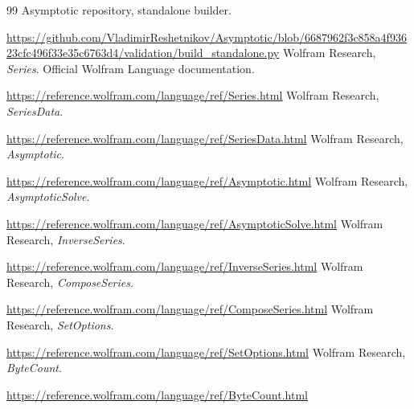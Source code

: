 \documentclass[11pt]{article}
\newcommand{\srcurl}[1]{\url{https://github.com/VladimirReshetnikov/Asymptotic/blob/6687962f3c858a4f93623cfc496f33e35c6763d4/#1}}
\begin{document}
\begin{thebibliography}{99}
 Asymptotic repository, standalone builder.\par\srcurl{validation/build_standalone.py}
 Wolfram Research, \emph{Series}. Official Wolfram Language documentation.\par\url{https://reference.wolfram.com/language/ref/Series.html}
 Wolfram Research, \emph{SeriesData}.\par\url{https://reference.wolfram.com/language/ref/SeriesData.html}
 Wolfram Research, \emph{Asymptotic}.\par\url{https://reference.wolfram.com/language/ref/Asymptotic.html}
 Wolfram Research, \emph{AsymptoticSolve}.\par\url{https://reference.wolfram.com/language/ref/AsymptoticSolve.html}
 Wolfram Research, \emph{InverseSeries}.\par\url{https://reference.wolfram.com/language/ref/InverseSeries.html}
 Wolfram Research, \emph{ComposeSeries}.\par\url{https://reference.wolfram.com/language/ref/ComposeSeries.html}
 Wolfram Research, \emph{SetOptions}.\par\url{https://reference.wolfram.com/language/ref/SetOptions.html}
 Wolfram Research, \emph{ByteCount}.\par\url{https://reference.wolfram.com/language/ref/ByteCount.html}
\end{thebibliography}
\end{document}
